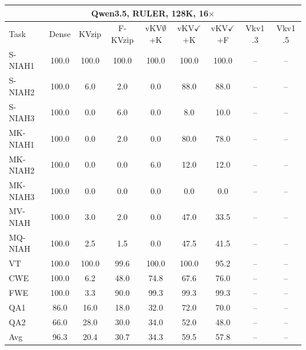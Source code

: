 \begin{tabular}{lcccccccc}
\toprule
\multicolumn{9}{c}{Qwen3.5, RULER, 128K, 16$\times$} \\
\midrule
Task & Dense & KVzip & F-KVzip & vKV$\emptyset$+K & vKV$\checkmark$+K & vKV$\checkmark$+F & Vkv1 .3 & Vkv1 .5 \\
\midrule
S-NIAH1 & 100.0 & 100.0 & 100.0 & 100.0 & 100.0 & 100.0 & -- & -- \\
S-NIAH2 & 100.0 & 6.0 & 2.0 & 0.0 & 88.0 & 88.0 & -- & -- \\
S-NIAH3 & 100.0 & 0.0 & 6.0 & 0.0 & 8.0 & 10.0 & -- & -- \\
MK-NIAH1 & 100.0 & 0.0 & 2.0 & 0.0 & 80.0 & 78.0 & -- & -- \\
MK-NIAH2 & 100.0 & 0.0 & 0.0 & 6.0 & 12.0 & 12.0 & -- & -- \\
MK-NIAH3 & 100.0 & 0.0 & 0.0 & 0.0 & 0.0 & 0.0 & -- & -- \\
MV-NIAH & 100.0 & 3.0 & 2.0 & 0.0 & 47.0 & 33.5 & -- & -- \\
MQ-NIAH & 100.0 & 2.5 & 1.5 & 0.0 & 47.5 & 41.5 & -- & -- \\
VT & 100.0 & 100.0 & 99.6 & 100.0 & 100.0 & 95.2 & -- & -- \\
CWE & 100.0 & 6.2 & 48.0 & 74.8 & 67.6 & 76.0 & -- & -- \\
FWE & 100.0 & 3.3 & 90.0 & 99.3 & 99.3 & 99.3 & -- & -- \\
QA1 & 86.0 & 16.0 & 18.0 & 32.0 & 72.0 & 70.0 & -- & -- \\
QA2 & 66.0 & 28.0 & 30.0 & 34.0 & 52.0 & 48.0 & -- & -- \\
\midrule
Avg & 96.3 & 20.4 & 30.7 & 34.3 & 59.5 & 57.8 & -- & -- \\
\bottomrule
\end{tabular}
\vspace{0.8em}

